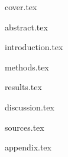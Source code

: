\documentclass[a4paper]{article}
\begin{document}
{cover.tex}

{abstract.tex}

\tableofcontents
\newpage

{introduction.tex}

{methods.tex}

{results.tex}

{discussion.tex}

{sources.tex}

{appendix.tex}
\end{document}
